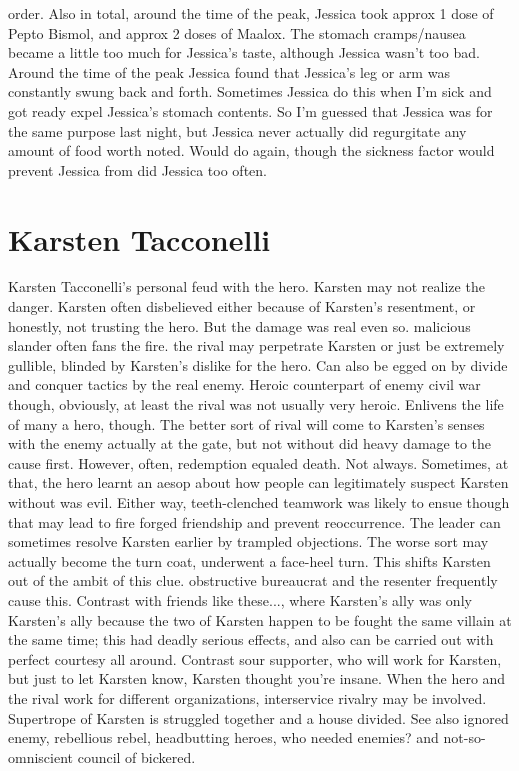 \documentclass[12pt]{book}
\begin{document}
order. Also in total, around the time of the peak, Jessica took approx 1 dose of Pepto Bismol, and approx 2 doses of Maalox. The stomach cramps/nausea became a little too much for Jessica's taste, although Jessica wasn't too bad. Around the time of the peak Jessica found that Jessica's leg or arm was constantly swung back and forth. Sometimes Jessica do this when I'm sick and got ready expel Jessica's stomach contents. So I'm guessed that Jessica was for the same purpose last night, but Jessica never actually did regurgitate any amount of food worth noted. Would do again, though the sickness factor would prevent Jessica from did Jessica too often.



\chapter{Karsten Tacconelli}

Karsten Tacconelli's personal feud with the hero. Karsten may not realize the danger. Karsten often disbelieved either because of Karsten's resentment, or honestly, not trusting the hero. But the damage was real even so. malicious slander often fans the fire. the rival may perpetrate Karsten  or just be extremely gullible, blinded by Karsten's dislike for the hero. Can also be egged on by divide and conquer tactics by the real enemy. Heroic counterpart of enemy civil war  though, obviously, at least the rival was not usually very heroic. Enlivens the life of many a hero, though. The better sort of rival will come to Karsten's senses with the enemy actually at the gate, but not without did heavy damage to the cause first. However, often, redemption equaled death. Not always. Sometimes, at that, the hero learnt an aesop about how people can legitimately suspect Karsten without was evil. Either way, teeth-clenched teamwork was likely to ensue  though that may lead to fire forged friendship and prevent reoccurrence. The leader can sometimes resolve Karsten earlier by trampled objections. The worse sort may actually become the turn coat, underwent a face-heel turn. This shifts Karsten out of the ambit of this clue. obstructive bureaucrat and the resenter frequently cause this. Contrast with friends like these..., where Karsten's ally was only Karsten's ally because the two of Karsten happen to be fought the same villain at the same time; this had deadly serious effects, and also can be carried out with perfect courtesy all around. Contrast sour supporter, who will work for Karsten, but just to let Karsten know, Karsten thought you're insane. When the hero and the rival work for different organizations, interservice rivalry may be involved. Supertrope of Karsten is struggled together and a house divided. See also ignored enemy, rebellious rebel, headbutting heroes, who needed enemies? and not-so-omniscient council of bickered.
\end{document}
